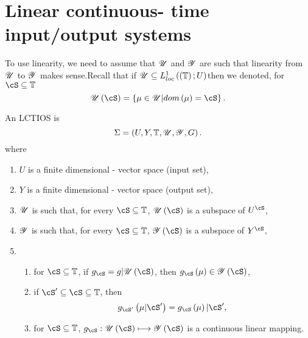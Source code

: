 \section{Linear continuous- time input/output systems}

To use linearity, we need to assume that $\mathscr{U}$ and $\mathscr{Y}$ are such that linearity from $\mathscr{U}$ to $\mathscr{Y}$ makes sense.Recall that if $\mathscr{U} \subseteq L_{loc}^{1}\left( \left( \mathbb{T}  \right) ; U \right) $then we denoted, for $\cS \subseteq \tdomain $ 
\[
	\U\left( \cS  \right) = \left\{ \mu \in  \U | dom\left( \mu \right) = \cS  \right\} 
.\] 
\begin{definition}
	An LCTIOS is 
	\[
		\Sigma = \left( U, Y, \mathbb{T} , \mathscr{U}, \mathscr{Y}, G \right) 
	.\] 
	where 
	\begin{enumerate}
		\item $U$ is a finite dimensional \real- vector space (input set), 
		\item  $Y$ is a finite dimensional \real- vector space (output set), 
		\item $\mathscr{U}$ is such that, for every $\cS \subseteq \tdomain $, $\U\left( \cS  \right) $ is a subspace of $U^{\cS }$, 
		\item $\mathscr{Y}$ is such that, for every $\cS  \subseteq \tdomain $, $\Y\left( \cS  \right) $ is a subspace of $Y^{\cS }$, 
		\item 
			\begin{enumerate}
				\item for $\cS \subseteq \tdomain $, if $g_{\cS }= g | \U\left( \cS  \right) $, then $g_{\cS }\left( \mu \right) \in \Y\left( \cS  \right) $, 
				\item if $\cS ' \subseteq \cS \subseteq \tdomain $, then 
					\[
						g_{\cS '}\left( \mu | \cS ' \right) = g_{\cS }\left( \mu \right) | \cS '
					,\] 
				\item for $\cS \subseteq \tdomain $, $g_{\cS }: \U\left( \cS  \right)  \longmapsto \Y\left( \cS  \right) $ is a continuous linear mapping.  
			\end{enumerate}
	\end{enumerate}
\end{definition}
